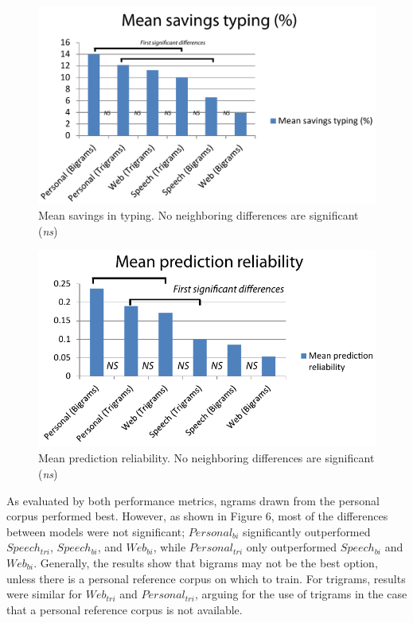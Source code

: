 \documentclass{sigchi}
\begin{document}
\begin{figure}
   \centering
   \includegraphics[width=\columnwidth]{Figs/typingSavingsChart.pdf}
   \caption{Mean savings in typing. No neighboring differences are
     significant ({\em ns})}
   \label{fig:savings}
\end{figure}

\begin{figure}
   \centering
   \includegraphics[width=\columnwidth]{Figs/meanPrediction.pdf}
   \caption{Mean prediction reliability. No neighboring differences are
     significant ({\em ns})}
   \label{fig:reliability}
\end{figure}

As evaluated by both performance metrics, ngrams drawn from the personal corpus performed best. However, as shown in Figure 6, most of the differences between models were not significant; $Personal_{bi}$ significantly outperformed $Speech_{tri}$, $Speech_{bi}$, and $Web_{bi}$, while $Personal_{tri}$ only outperformed $Speech_{bi}$ and $Web_{bi}$. Generally, the results show that bigrams may not be the best option, unless there is a personal reference corpus on which to train. For trigrams, results were similar for $Web_{tri}$ and $Personal_{tri}$, arguing for the use of trigrams in the case that a personal reference corpus is not available.
\end{document}
